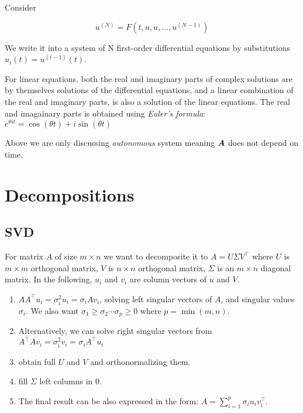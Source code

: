 \documentclass{article}
\begin{document}
Consider

\[u^{(N)}=F(t,u,\dot u,\dots,u^{(N-1)})\]

We write it into a system of N first-order differential equations by substitutions \(u_i(t) = u^{(i-1)}(t)\).

\begin{remark}
    For linear equations, both the real and imaginary parts of complex solutions are by themselves solutions of the differential equations, and a linear combination of the real and imaginary parts, is also a solution of the linear equations. The real and imagainary parts is obtained using {\it Euler's formula}: \(e^{\theta it} =\cos(\theta t)+i\sin(\theta t)\)
\end{remark}

\begin{remark}
    Above we are only discussing {\it autonomous} system meaning \(\boldsymbol{A}\) does not depend on time.
\end{remark}

\section{Decompositions}

\subsection{SVD}
For matrix \(A\) of size \(m\times n\) we want to decomposite it to \(A = U\Sigma V^\top\) where \(U\) is \(m\times m\) orthogonal matrix, \(V\) is \(n\times n\) orthogonal matrix, \(\Sigma\) is an \(m \times n\) diagonal matrix. In the following, \(u_i\) and \(v_i\) are column vectors of \(u\) and \(V\). 

\begin{enumerate}
    \item \(AA^\top u_i = \sigma_i^2 u_i = \sigma_i A v_i\), solving left singular vectors of \(A\), and singular values \(\sigma_i\). We also want \(\sigma_1\geq\sigma_2\cdots\sigma_p\geq 0\) where \(p=\min (m,n)\).
    \item Alternatively, we can solve right singular vectors from \(A^\top A v_i = \sigma_i^2 v_i = \sigma_i A^\top u_i\)
    \item obtain full \(U\) and \(V\) and orthonormalizing them.
    \item fill \(\Sigma\) left columns in \(0\).
    \item The final result can be also expressed in the form: \(A = \sum_{i=1}^p \sigma_i u_i v_i^\top\).
\end{enumerate}
\end{document}
